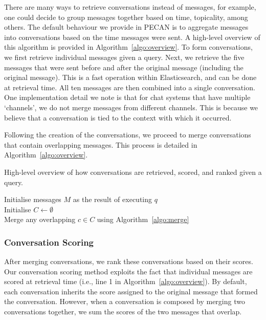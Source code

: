 There are many ways to retrieve conversations instead of messages, for example, one could decide to group messages together based on time, topicality, among others. The default behaviour we provide in PECAN is to aggregate messages into conversations based on the time messages were sent. A high-level overview of this algorithm is provided in Algorithm~\ref{algo:overview}. To form conversations, we first retrieve individual messages given a query. Next, we retrieve the five messages that were sent before and after the original message (including the original message). This is a fast operation within Elasticsearch, and can be done at retrieval time. All ten messages are then combined into a single conversation. One implementation detail we note is that for chat systems that have multiple `channels', we do not merge messages from different channels. This is because we believe that a conversation is tied to the context with which it occurred.

Following the creation of the conversations, we proceed to merge conversations that contain overlapping messages. This process is detailed in Algorithm~\ref{algo:overview}.



\begin{algorithm}
	\SetAlgoLined
	\caption{High-level overview of how conversations are retrieved, scored, and ranked given a query.}
	\label{algo:overview}
	Initialise messages $M$ as the result of executing $q$\\
	Initialise $C\gets\emptyset$\\ 
    Merge any overlapping $c\in C$ using Algorithm~\ref{algo:merge}\\
	\end{algorithm}
		
	
		
\subsubsection{Conversation Scoring}
\label{sec:conv-scoring}

After merging conversations, we rank these conversations based on their scores. Our conversation scoring method exploits the fact that individual messages are scored at retrieval time (i.e., line 1 in Algorithm~\ref{algo:overview}). By default, each conversation inherits the score assigned to the original message that formed the conversation. However, when a conversation is composed by merging two conversations together, we sum the scores of the two messages that overlap.



